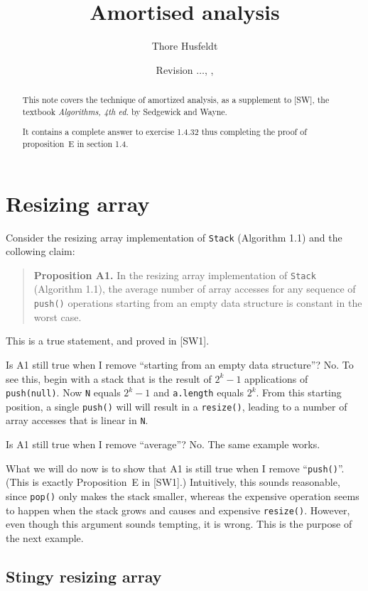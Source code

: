 \documentclass{tufte-handout}
\title{Amortised analysis}
\author{Thore Husfeldt}
\date{\small Revision {\tt \GITAbrHash}$\ldots$, \GITAuthorDate, \GITAuthorName}
\begin{document}
\maketitle
\begin{abstract}
  This note covers the technique of amortized analysis, as a
  supplement to [SW], the textbook \emph{Algorithms, 4th ed.} by
  Sedgewick and Wayne.

  It contains a complete answer to exercise 1.4.32 thus completing the
  proof of proposition~E in section 1.4.
\end{abstract}

\section{Resizing array}
\label{sec-1.1}

Consider the resizing array implementation of {\tt Stack} (Algorithm
1.1) and the collowing claim:

   
\begin{quote} {\bf Proposition A1.} In the resizing array
  implementation of {\tt Stack} (Algorithm 1.1), the average number of
  array accesses for any sequence of {\tt push()} operations starting
  from an empty data structure is constant in the worst case.
\end{quote}

This is a true statement, and proved in [SW1].

Is A1 still true when I remove ``starting from an empty data
structure''?
No.
To see this, begin with a stack that is the result of $2^k-1$
applications of {\tt push(null)}. 
Now {\tt N} equals $2^k-1$ and {\tt  a.length} equals $2^k$. 
From this starting position, a single {\tt push()} will will result in
a {\tt resize()}, leading to a  number of array accesses that is
linear in {\tt N}.
   
Is A1 still true when I remove ``average''?
No.
The same example works.
   
What we will do now is to show that A1 is still true when I remove
``{\tt push()}''. 
(This is exactly Proposition~E in [SW1].)
Intuitively, this sounds reasonable, since {\tt pop()} only makes the
stack smaller, whereas the expensive operation seems to happen when
the stack grows and causes and expensive {\tt resize()}.
However, even though this argument sounds tempting, it is wrong.
This is the purpose of the next example.
  
\subsection*{Stingy resizing array}
\label{sec-1.2}
\end{document}
